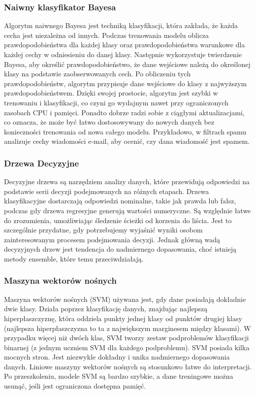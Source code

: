 \documentclass[12pt,a4paper]{article}
\begin{document}
\subsubsection{Naiwny klasyfikator Bayesa} 
Algorytm naiwnego Bayesa jest techniką klasyfikacji, która zakłada, że każda cecha jest niezależna od innych. Podczas trenowania modelu oblicza prawdopodobieństwa dla każdej klasy oraz prawdopodobieństwa warunkowe dla każdej cechy w odniesieniu do danej klasy. Następnie wykorzystuje twierdzenie Bayesa, aby określić prawdopodobieństwo, że dane wejściowe należą do określonej klasy na podstawie zaobserwowanych cech. Po obliczeniu tych prawdopodobieństw, algorytm przypisuje dane wejściowe do klasy z najwyższym prawdopodobieństwem. Dzięki swojej prostocie, algorytm jest szybki w trenowaniu i klasyfikacji, co czyni go wydajnym nawet przy ograniczonych zasobach CPU i pamięci. Ponadto dobrze radzi sobie z ciągłymi aktualizacjami, co oznacza, że może być łatwo dostosowywany do nowych danych bez konieczności trenowania od nowa całego modelu. Przykładowo, w filtrach spamu analizuje cechy wiadomości e-mail, aby ocenić, czy dana wiadomość jest spamem.

\subsubsection{Drzewa Decyzyjne} 
Decyzyjne drzewa są narzędziem analizy danych, które przewidują odpowiedzi na podstawie serii decyzji podejmowanych na różnych etapach. Drzewa klasyfikacyjne dostarczają odpowiedzi nominalne, takie jak prawda lub fałsz, podczas gdy drzewa regresyjne generują wartości numeryczne. Są względnie łatwe do zrozumienia, umożliwiając śledzenie ścieżki od korzenia do liścia. Jest to szczególnie przydatne, gdy potrzebujemy wyjaśnić wyniki osobom zainteresowanym procesem podejmowania decyzji. Jednak główną wadą decyzyjnych drzew jest tendencja do nadmiernego dopasowania, choć istnieją metody ensemble, które temu przeciwdziałają. 

\subsubsection{Maszyna wektorów nośnych} 
Maszyna wektorów nośnych (SVM) używana jest, gdy dane posiadają dokładnie dwie klasy. Działa poprzez klasyfikację danych, znajdując najlepszą hiperpłaszczyznę, która oddziela punkty jednej klasy od punktów drugiej klasy (najlepsza hiperpłaszczyzna to ta z największym marginesem między klasami). W przypadku więcej niż dwóch klas, SVM tworzy zestaw podproblemów klasyfikacji binarnej (z jednym uczniem SVM dla każdego podproblemu). SVM posiada kilka mocnych stron. Jest niezwykle dokładny i unika nadmiernego dopasowania danych. Liniowe maszyny wektorów nośnych są stosunkowo łatwe do interpretacji. Po przeszkoleniu, modele SVM są bardzo szybkie, a dane treningowe można usunąć, jeśli jest ograniczona dostępna pamięć.
\end{document}
